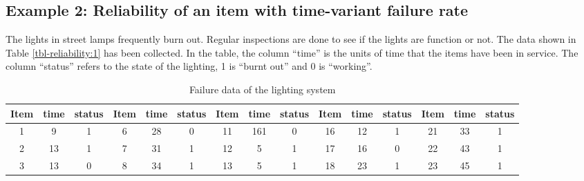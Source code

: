 \subsection{Example 2: Reliability of an item with time-variant failure rate}
The lights in street lamps frequently burn out. Regular inspections are done to
see if the lights are function or not. The data shown in Table \ref{tbl-reliability:1} has
been collected. In the table, the column ``time'' is the units of time that the
items have been in service. The column ``status'' refers to the state of the
lighting, 1 is ``burnt out'' and 0 is ``working''.
\begin{table}[h]
\caption{Failure data of the lighting system}
\vspace{3pt} \noindent
\begin{tabular}{|l|l|l|l|l|l|l|l|l|l|l|l|l|l|l|}
\hline
\multicolumn{1}{|c|}{Item} & \multicolumn{1}{c|}{time} & \multicolumn{1}{c|}{status} & \multicolumn{1}{c|}{Item} & \multicolumn{1}{c|}{time} & \multicolumn{1}{c|}{status} & \multicolumn{1}{c|}{Item} & \multicolumn{1}{c|}{time} & \multicolumn{1}{c|}{status} & \multicolumn{1}{c|}{Item} & \multicolumn{1}{c|}{time} & \multicolumn{1}{c|}{status} & \multicolumn{1}{c|}{Item} & \multicolumn{1}{c|}{time} & \multicolumn{1}{c|}{status} \\ 
\hline
\multicolumn{1}{|c|}{1} & \multicolumn{1}{c|}{9} & \multicolumn{1}{c|}{1} & \multicolumn{1}{c|}{6} & \multicolumn{1}{c|}{28} & \multicolumn{1}{c|}{0} & \multicolumn{1}{c|}{11} & \multicolumn{1}{c|}{161} & \multicolumn{1}{c|}{0} & \multicolumn{1}{c|}{16} & \multicolumn{1}{c|}{12} & \multicolumn{1}{c|}{1} & \multicolumn{1}{c|}{21} & \multicolumn{1}{c|}{33} & \multicolumn{1}{c|}{1} \\ 
\hline
\multicolumn{1}{|c|}{2} & \multicolumn{1}{c|}{13} & \multicolumn{1}{c|}{1} & \multicolumn{1}{c|}{7} & \multicolumn{1}{c|}{31} & \multicolumn{1}{c|}{1} & \multicolumn{1}{c|}{12} & \multicolumn{1}{c|}{5} & \multicolumn{1}{c|}{1} & \multicolumn{1}{c|}{17} & \multicolumn{1}{c|}{16} & \multicolumn{1}{c|}{0} & \multicolumn{1}{c|}{22} & \multicolumn{1}{c|}{43} & \multicolumn{1}{c|}{1} \\ 
\hline
\multicolumn{1}{|c|}{3} & \multicolumn{1}{c|}{13} & \multicolumn{1}{c|}{0} & \multicolumn{1}{c|}{8} & \multicolumn{1}{c|}{34} & \multicolumn{1}{c|}{1} & \multicolumn{1}{c|}{13} & \multicolumn{1}{c|}{5} & \multicolumn{1}{c|}{1} & \multicolumn{1}{c|}{18} & \multicolumn{1}{c|}{23} & \multicolumn{1}{c|}{1} & \multicolumn{1}{c|}{23} & \multicolumn{1}{c|}{45} & \multicolumn{1}{c|}{1} \\ 

\end{tabular}
\end{table}
